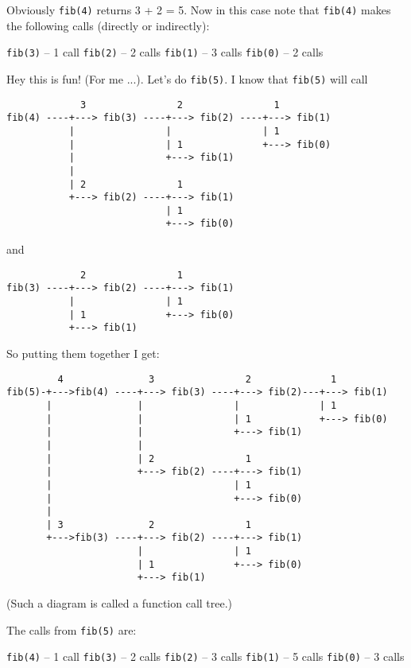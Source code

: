 Obviously \verb!fib(4)! returns 3 + 2 = 5. Now in this case note that \verb!fib(4)! makes the following calls
(directly or indirectly):

\begin{tightlist}
    \li \verb!fib(3)! -- 1 call
    \li \verb!fib(2)! -- 2 calls
    \li \verb!fib(1)! -- 3 calls
    \li \verb!fib(0)! -- 2 calls
\end{tightlist}



\newpage
Hey this is fun! (For me ...). Let's do \verb!fib(5)!. I know that
\verb!fib(5)! will call

\begin{Verbatim}
             3                2                1
fib(4) ----+---> fib(3) ----+---> fib(2) ----+---> fib(1)
           |                |                | 1
           |                | 1              +---> fib(0)
           |                +---> fib(1)
           |
           | 2                1
           +---> fib(2) ----+---> fib(1)
                            | 1
                            +---> fib(0)
\end{Verbatim}           
and
\begin{Verbatim}
             2                1
fib(3) ----+---> fib(2) ----+---> fib(1)
           |                | 1
           | 1              +---> fib(0)
           +---> fib(1)
\end{Verbatim}

So putting them together I get:

\begin{Verbatim}
         4               3                2              1
fib(5)-+--->fib(4) ----+---> fib(3) ----+---> fib(2)---+---> fib(1)
       |               |                |              | 1
       |               |                | 1            +---> fib(0)
       |               |                +---> fib(1)
       |               |
       |               | 2                1
       |               +---> fib(2) ----+---> fib(1)
       |                                | 1
       |                                +---> fib(0)
       |   
       | 3               2                1
       +--->fib(3) ----+---> fib(2) ----+---> fib(1)
                       |                | 1
                       | 1              +---> fib(0)
                       +---> fib(1)
\end{Verbatim}
(Such a diagram is called a function call tree.)


\newpage
The calls from \verb!fib(5)! are:
\begin{tightlist}
  \li \verb!fib(4)! -- 1 call
  \li \verb!fib(3)! -- 2 calls
  \li \verb!fib(2)! -- 3 calls
  \li \verb!fib(1)! -- 5 calls
  \li \verb!fib(0)! -- 3 calls
\end{tightlist}

